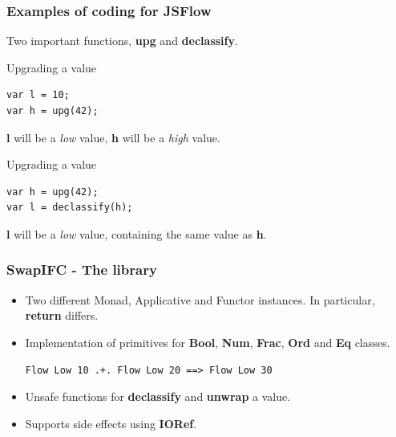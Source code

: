 \documentclass{beamer}
\begin{document}

\begin{frame}[fragile]
  \frametitle{Examples of coding for JSFlow}
  Two important functions, \textbf{upg} and \textbf{declassify}.
  \pause
  \begin{block}{Upgrading a value}
\begin{verbatim}
var l = 10;
var h = upg(42);
\end{verbatim}
  \end{block}
  \textbf{l} will be a \emph{low} value, \textbf{h} will be a \emph{high} value.
  \pause
  \begin{block}{Upgrading a value}
\begin{verbatim}
var h = upg(42);
var l = declassify(h);
\end{verbatim}
  \end{block}
  \textbf{l} will be a \emph{low} value, containing the same value as \textbf{h}.
\end{frame}


\begin{frame}[fragile]
  \frametitle{SwapIFC - The library}
  \begin{itemize}
    \item Two different Monad, Applicative and Functor instances. In particular, \textbf{return} differs. \pause
    \item Implementation of primitives for \textbf{Bool}, \textbf{Num}, \textbf{Frac}, \textbf{Ord} and \textbf{Eq} classes. \pause
\begin{verbatim}
Flow Low 10 .+. Flow Low 20 ==> Flow Low 30
\end{verbatim}
\pause
    \item Unsafe functions for \textbf{declassify} and \textbf{unwrap} a value. \pause
    \item Supports side effects using \textbf{IORef}.
  \end{itemize}
\end{frame}

\end{document}
